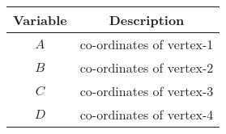 \begin{tabular}[12pt]{ |c| c|}
    \hline
    \textbf{Variable} & \textbf{Description}\\ 
    \hline
    $A$ & co-ordinates of vertex-1 \\
    \hline
    $B$ & co-ordinates of vertex-2 \\
    \hline
    $C$ & co-ordinates of vertex-3 \\
    \hline
    $D$ & co-ordinates of vertex-4 \\
    \hline
    \end{tabular}